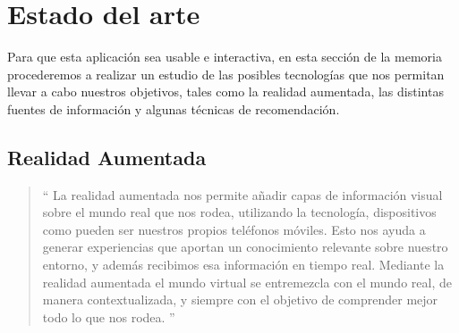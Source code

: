 
\cleardoublepage


\chapter{Estado del arte}
\label{makereference2}
Para que esta aplicación sea usable e interactiva, en esta sección de la memoria procederemos a 
realizar un estudio de las posibles tecnologías que nos permitan llevar a cabo nuestros objetivos, 
tales como la realidad aumentada, las distintas fuentes de información y algunas
técnicas de recomendación. 
\section{Realidad Aumentada}
\label{makereference2.1}

\begin{quote}
``
La realidad aumentada nos permite añadir capas de información visual sobre el 
mundo real que nos rodea, utilizando la tecnología, dispositivos como pueden ser 
nuestros propios teléfonos móviles. Esto nos ayuda a generar experiencias que aportan
un conocimiento relevante sobre nuestro entorno, y además recibimos esa información en 
tiempo real. Mediante la realidad aumentada el mundo virtual se entremezcla con el mundo 
real, de manera contextualizada, y siempre con el objetivo de comprender mejor todo lo que 
nos rodea.
''
\end{quote}


